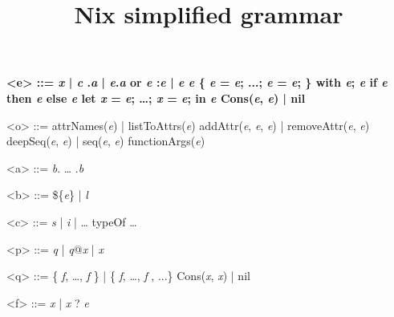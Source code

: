 \documentclass{article}
\title{Nix simplified grammar}
\date{}
\newcommand{\meta}[1]{{\it{#1}}} %
\renewcommand{\|}{\textrm{|}}
\def\e/{\meta{e}}
\def\a/{\meta{a}}
\def\b/{\meta{b}}
\def\c/{\meta{c}}
\def\p/{\meta{p}}
\def\q/{\meta{q}}
\def\f/{\meta{f}}
\def\x/{\meta{x}}
\def\o/{\meta{o}}
\begin{document}
\maketitle{}

\begin{grammar}
  \bfseries
  <e> ::=
    \x/ \| \c/
    \alt \e/.\a/ \| \e/.\a/ or \e/
    \alt \p/:\e/ \| \e/ \e/
    \alt \{ \e/ = \e/; ...; \e/ = \e/; \}
    \alt with \e/; \e/
    \alt if \e/ then \e/ else \e/
    \alt let \x/ = \e/; \ldots{;} \x/ = \e/; in \e/
    \alt Cons(\e/, \e/) \| nil
    \alt \o/

    <o> ::= attrNames(\e/) \| listToAttrs(\e/)
    \alt addAttr(\e/, \e/, \e/) \| removeAttr(\e/, \e/)
    \alt deepSeq(\e/, \e/) \| seq(\e/, \e/)
    \alt functionArgs(\e/)

  <a> ::= \b/. \ldots{} .\b/

  <b> ::= \$\{\e/\} \| \meta{l}

  <c> ::= \meta{s} \| \meta{i} \| \ldots{}
    \alt typeOf
    \alt \ldots{}

  <p> ::= \q/ \| \q/@\x/ \| \x/

  <q> ::= \{ \f/, \ldots{,} \f/ \} \| \{ \f/, \ldots{,} \f/ , ...\}
    \alt Cons(\x/, \x/) \| nil
    \alt \c/

  <f> ::= \x/ \| \x/ ? \e/

\end{grammar}
\end{document}
